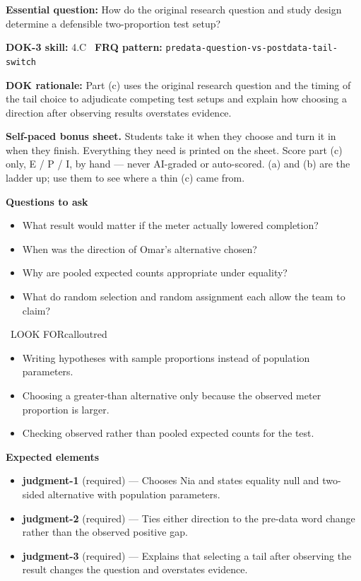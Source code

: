 \documentclass[11pt]{article}
\begin{document}
\textbf{Essential question:} How do the original research question and study design determine a defensible two-proportion test setup?\par
\textbf{DOK-3 skill:} 4.C \textperiodcentered\ \textbf{FRQ pattern:} {\small\texttt{predata-\allowbreak{}question-\allowbreak{}vs-\allowbreak{}postdata-\allowbreak{}tail-\allowbreak{}switch}}\par
\textbf{DOK rationale:} Part (c) uses the original research question and the timing of the tail choice to adjudicate competing test setups and explain how choosing a direction after observing results overstates evidence.\par

\textbf{Self-paced bonus sheet.} Students take it when they choose and turn it in when they finish. Everything they need is printed on the sheet. Score part (c) only, E / P / I, by hand --- never AI-graded or auto-scored. (a) and (b) are the ladder up; use them to see where a thin (c) came from.\par

\textbf{Questions to ask}
\begin{itemize}[leftmargin=1.5em,itemsep=2pt,topsep=2pt]
  \item What result would matter if the meter actually lowered completion?
  \item When was the direction of Omar's alternative chosen?
  \item Why are pooled expected counts appropriate under equality?
  \item What do random selection and random assignment each allow the team to claim?
\end{itemize}

\begin{callout}{\IconWarn\ LOOK FOR}{calloutred}
\begin{itemize}[leftmargin=1.5em,itemsep=2pt,topsep=2pt]
  \item Writing hypotheses with sample proportions instead of population parameters.
  \item Choosing a greater-than alternative only because the observed meter proportion is larger.
  \item Checking observed rather than pooled expected counts for the test.
\end{itemize}
\end{callout}


\textbf{Expected elements}
\begin{itemize}[leftmargin=1.5em,itemsep=2pt,topsep=2pt]
  \item \textbf{judgment-1} (required) --- Chooses Nia and states equality null and two-sided alternative with population parameters.
  \item \textbf{judgment-2} (required) --- Ties either direction to the pre-data word change rather than the observed positive gap.
  \item \textbf{judgment-3} (required) --- Explains that selecting a tail after observing the result changes the question and overstates evidence.
\end{itemize}
\end{document}
